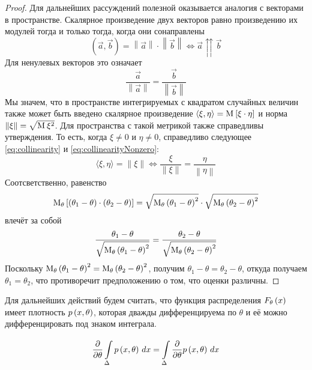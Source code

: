 \begin{proof}
  Для дальнейших рассуждений полезной оказывается аналогия с векторами в
  пространстве.
  Скалярное произведение двух векторов равно произведению их модулей тогда и
  только тогда, когда они сонаправлены
  \begin{equation}\label{eq:collinearity}
    \left( \vec{a}, \vec{b} \right)
    = \left\| \vec{a} \right\| \cdot \left\| \vec{b} \right\|
    \Leftrightarrow
    \vec{a} \upuparrows \vec{b}
  \end{equation}
  Для ненулевых векторов это означает
  \begin{equation}\label{eq:collinearityNonzero}
    \frac{\vec{a}}{\left\| \vec{a} \right\|}
    = \frac{\vec{b}}{\left\| \vec{b} \right\|}
  \end{equation}
  Мы значем, что в пространстве интегрируемых с квадратом случайных величин
  также может быть введено скалярное произведение
  $\langle \xi, \eta \rangle = \Mean{\xi \cdot \eta}$ и норма
  $\left\| \xi \right\| = \sqrt{\mean{\xi^2}}$.
  Для пространства с такой метрикой также справедливы утверждения.
  То есть, когда $\xi \neq 0$ и $\eta \neq 0$, справедливо следующее
  \eqref{eq:collinearity} и \eqref{eq:collinearityNonzero}:
  \begin{equation}
    \langle \xi, \eta \rangle = \left\| \xi \right\|
    \Leftrightarrow
    \frac{\xi}{\left\| \xi \right\|} = \frac{\eta}{\left\| \eta \right\|}
  \end{equation}
  Соотсветственно, равенство
  \begin{equation*}
    \meanof{\theta}{\left[ \left( \theta_1-\theta \right)
      \cdot \left( \theta_2-\theta \right) \right]}
    = \sqrt{\meanof{\theta}{\left( \theta_1-\theta \right)^2}}
      \cdot \sqrt{\meanof{\theta}{\left( \theta_2-\theta \right)^2}}
  \end{equation*}
  влечёт за собой
  \begin{equation*}
    \frac{\theta_1 - \theta}
      {\sqrt{\meanof{\theta}{\left( \theta_1-\theta \right)^2}}}
    = \frac{\theta_2 - \theta}
      {\sqrt{\meanof{\theta}{\left( \theta_2-\theta \right)^2}}}
  \end{equation*}
  Поскольку
  $\meanof{\theta}{\left( \theta_1-\theta \right)^2}
    = \meanof{\theta}{\left( \theta_2-\theta \right)^2}$,
  получим $\theta_1 - \theta = \theta_2 - \theta$, откуда получаем
  $\theta_1 = \theta_2$, что противоречит предположению о том, что оценки
  различны.
\end{proof}

\begin{remark}\label{remark:doubleDiff}
  Для дальнейших действий будем считать, что функция распределения
  $\cdfof{\theta}{x}$ имеет плотность $\pdf{x,\theta}$,
  которая дважды дифференцируема по $\theta$ и её можно дифференцировать под
  знаком интеграла.\footnotemark

  \begin{equation*}
    \frac{\partial}{\partial \theta}\integrall{\Delta}{dx}{\pdf{x, \theta}}
    = \integrall{\Delta}{dx}{\frac{\partial}{\partial \theta}\pdf{x, \theta}}
  \end{equation*}
\end{remark}

